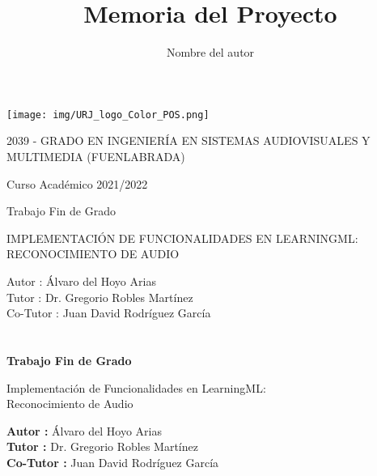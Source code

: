 \documentclass[a4paper, 12pt]{book}
\title{Memoria del Proyecto}
\author{Nombre del autor}
\begin{document}
\renewcommand{\refname}{Bibliografía}  %
\renewcommand{\appendixname}{Apéndice}


\begin{titlepage}
\begin{center}
\texttt{[image: img/URJ\_logo\_Color\_POS.png]}

\vspace{1.75cm}

\Large
2039 - GRADO EN INGENIERÍA EN SISTEMAS AUDIOVISUALES Y MULTIMEDIA (FUENLABRADA)

\vspace{0.4cm}

\large
Curso Académico 2021/2022

\vspace{0.8cm}

Trabajo Fin de Grado

\vspace{2.5cm}

\LARGE
IMPLEMENTACIÓN DE FUNCIONALIDADES EN LEARNINGML: RECONOCIMIENTO DE AUDIO

\vspace{4cm}

\large
Autor : Álvaro del Hoyo Arias \\
Tutor : Dr. Gregorio Robles Martínez \\
Co-Tutor : Juan David Rodríguez García
\end{center}
\end{titlepage}

\newpage
\mbox{}
\thispagestyle{empty} %


\clearpage
{}
\chapter*{}

\vspace{-4cm}
\begin{center}
\LARGE
\textbf{Trabajo Fin de Grado}

\vspace{1cm}
\large
Implementación de Funcionalidades en LearningML: \\ Reconocimiento de Audio

\vspace{1cm}
\large
\textbf{Autor :} Álvaro del Hoyo Arias \\
\textbf{Tutor :} Dr. Gregorio Robles Martínez \\
\textbf{Co-Tutor :} Juan David Rodríguez García

\end{center}
\end{document}
